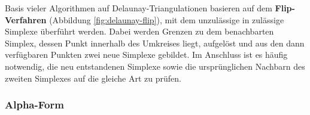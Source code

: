 Basis vieler Algorithmen auf Delaunay-Triangulationen basieren auf dem \textbf{Flip-Verfahren} (Abbildung \ref{fig:delaunay-flip}), mit dem unzulässige in zulässige Simplexe überführt werden.
Dabei werden Grenzen zu dem benachbarten Simplex, dessen Punkt innerhalb des Umkreises liegt, aufgelöst und aus den dann verfügbaren Punkten zwei neue Simplexe gebildet.
Im Anschluss ist es häufig notwendig, die neu entstandenen Simplexe sowie die ursprünglichen Nachbarn des zweiten Simplexes auf die gleiche Art zu prüfen.




\subsubsection{Alpha-Form}

